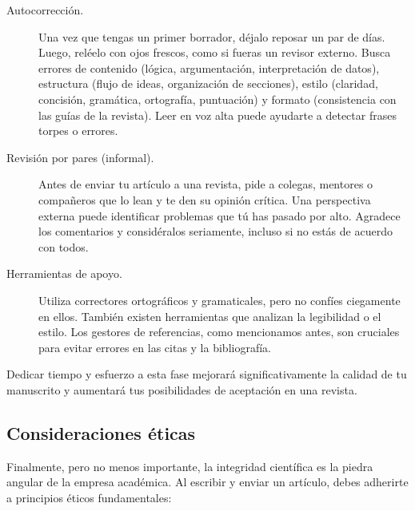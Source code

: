 \begin{description}
	\item[Autocorrección.] Una vez que tengas un primer borrador, déjalo reposar un par de días.
	      Luego, reléelo con ojos frescos, como si fueras un revisor externo.
	      Busca errores de contenido (lógica, argumentación, interpretación de datos), estructura (flujo de ideas, organización de secciones), estilo (claridad, concisión, gramática, ortografía, puntuación) y formato (consistencia con las guías de la revista).
	      Leer en voz alta puede ayudarte a detectar frases torpes o errores.
	\item[Revisión por pares (informal).] Antes de enviar tu artículo a una revista, pide a colegas, mentores o compañeros que lo lean y te den su opinión crítica.
	      Una perspectiva externa puede identificar problemas que tú has pasado por alto.
	      Agradece los comentarios y considéralos seriamente, incluso si no estás de acuerdo con todos.
	\item[Herramientas de apoyo.] Utiliza correctores ortográficos y gramaticales, pero no confíes ciegamente en ellos.
	      También existen herramientas que analizan la legibilidad o el estilo.
	      Los gestores de referencias, como mencionamos antes, son cruciales para evitar errores en las citas y la bibliografía.
\end{description}
Dedicar tiempo y esfuerzo a esta fase mejorará significativamente la calidad de tu manuscrito y aumentará tus posibilidades de aceptación en una revista.

\subsection*{Consideraciones éticas}
\label{sub:eticapublicacion}

Finalmente, pero no menos importante, la integridad científica es la piedra angular de la empresa académica.
Al escribir y enviar un artículo, debes adherirte a principios éticos fundamentales:

